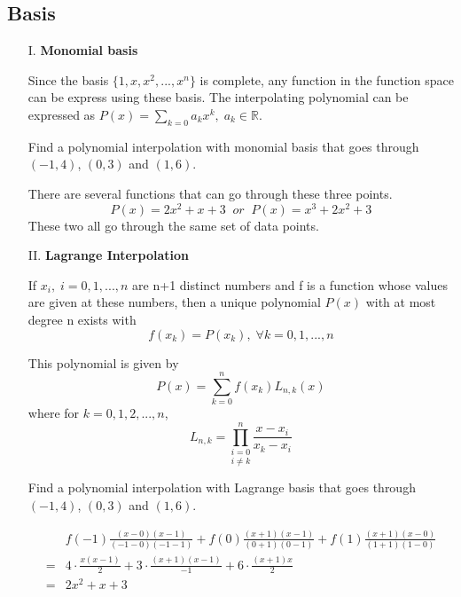 \subsection{Basis}
\begin{enumerate}
	\item [I.]
	\textbf{Monomial basis}
	\begin{thm}
		Since the basis $\{1,x,x^2,...,x^n\}$ is complete, any function in the function space can be express using these basis. The interpolating polynomial can be expressed as $P(x) = \sum_{k=0} a_kx^k,\;a_k\in\mathbb{R}$.
	\end{thm}
	
	\begin{ex}
		Find a polynomial interpolation with monomial basis that goes through $(-1,4)$, $(0,3)$ and $(1,6)$.
	\end{ex}
	\begin{solution}
		There are several functions that can go through these three points.
		\[P(x) = 2x^2 + x + 3 \;\; or\;\; P(x) = x^3 + 2x^2 +3\]
		These two all go through the same set of data points.
	\end{solution}

	\item [II.]
	\textbf{Lagrange Interpolation}
	\begin{existunique}
		If $x_i,\; i=0,1,...,n$ are n+1 distinct numbers and f is a function whose values are given at these numbers, then a unique polynomial $P(x)$ with at most degree n exists with
		\[ f(x_k) = P(x_k), \; \forall k=0,1,...,n \]
		
		This polynomial is given by 
		\[ P(x) = \sum_{k=0}^{n} f(x_k)L_{n,k}(x) \]
		where for $k=0,1,2,...,n$,
		\[ L_{n,k} = \underset{i\neq k}{\prod^n_{i=0}} \frac{x-x_i}{x_k-x_i} \]
	\end{existunique}
	
	\begin{ex}
		Find a polynomial interpolation with Lagrange basis that goes through $(-1,4)$, $(0,3)$ and $(1,6)$.
	\end{ex}

	\begin{solution}
		\begin{align*}
		&f(-1)\frac{(x-0)(x-1)}{(-1-0)(-1-1)} +f(0)\frac{(x+1)(x-1)}{(0+1)(0-1)} + f(1)\frac{(x+1)(x-0)}{(1+1)(1-0)} \\
		= & 4\cdot \frac{x(x-1)}{2} + 3\cdot \frac{(x+1)(x-1)}{-1} + 6\cdot \frac{(x+1)x}{2} \\
		= & 2x^2 + x + 3  
		\end{align*}
		

\end{solution}
\end{enumerate}
